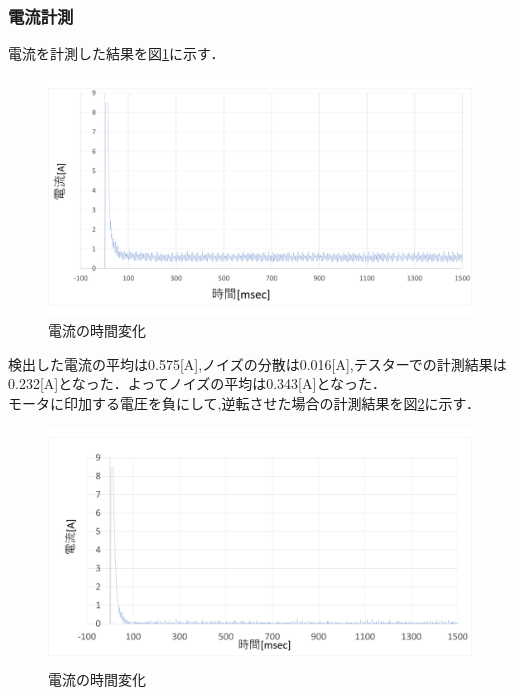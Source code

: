 \subsubsection{電流計測}
電流を計測した結果を図\ref{fig:currentMeasurement}に示す．

\begin{figure}[H]
 \begin{center}
    \includegraphics[width=150mm]{img/currentMeasurement.png}
    \end{center}
  \caption{電流の時間変化}
 \label{fig:currentMeasurement}
\end{figure}

検出した電流の平均は0.575[A],ノイズの分散は0.016[A],テスターでの計測結果は0.232[A]となった．よってノイズの平均は0.343[A]となった．
\\
モータに印加する電圧を負にして,逆転させた場合の計測結果を図\ref{fig:currentMeasurement3}に示す．

\begin{figure}[H]
 \begin{center}
    \includegraphics[width=150mm]{img/currentMeasurement3.png}
    \end{center}
  \caption{電流の時間変化}
 \label{fig:currentMeasurement3}
\end{figure}

